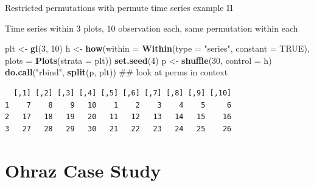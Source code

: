 \documentclass[10pt,ignorenonframetext,compress, aspectratio=169]{beamer}
\newenvironment{Shaded}{\begin{snugshade}}{\end{snugshade}}
\newcommand{\KeywordTok}[1]{\textcolor[rgb]{0.13,0.29,0.53}{\textbf{{#1}}}}
\newcommand{\DataTypeTok}[1]{\textcolor[rgb]{0.13,0.29,0.53}{{#1}}}
\newcommand{\DecValTok}[1]{\textcolor[rgb]{0.00,0.00,0.81}{{#1}}}
\newcommand{\StringTok}[1]{\textcolor[rgb]{0.31,0.60,0.02}{{#1}}}
\newcommand{\OtherTok}[1]{\textcolor[rgb]{0.56,0.35,0.01}{{#1}}}
\newcommand{\NormalTok}[1]{{#1}}
\begin{document}
\begin{frame}[fragile]{Restricted permutations with permute \textbar{}
time series example II}

Time series within 3 plots, 10 observation each, same permutation within
each

\scriptsize

\begin{Shaded}
\begin{Highlighting}[]
\NormalTok{plt <-}\StringTok{ }\KeywordTok{gl}\NormalTok{(}\DecValTok{3}\NormalTok{, }\DecValTok{10}\NormalTok{)}
\NormalTok{h <-}\StringTok{ }\KeywordTok{how}\NormalTok{(}\DataTypeTok{within =} \KeywordTok{Within}\NormalTok{(}\DataTypeTok{type =} \StringTok{"series"}\NormalTok{, }\DataTypeTok{constant =} \OtherTok{TRUE}\NormalTok{),}
         \DataTypeTok{plots =} \KeywordTok{Plots}\NormalTok{(}\DataTypeTok{strata =} \NormalTok{plt))}
\KeywordTok{set.seed}\NormalTok{(}\DecValTok{4}\NormalTok{)}
\NormalTok{p <-}\StringTok{ }\KeywordTok{shuffle}\NormalTok{(}\DecValTok{30}\NormalTok{, }\DataTypeTok{control =} \NormalTok{h)}
\KeywordTok{do.call}\NormalTok{(}\StringTok{"rbind"}\NormalTok{, }\KeywordTok{split}\NormalTok{(p, plt)) ## look at perms in context}
\end{Highlighting}
\end{Shaded}

\begin{verbatim}
  [,1] [,2] [,3] [,4] [,5] [,6] [,7] [,8] [,9] [,10]
1    7    8    9   10    1    2    3    4    5     6
2   17   18   19   20   11   12   13   14   15    16
3   27   28   29   30   21   22   23   24   25    26
\end{verbatim}

\normalsize

\end{frame}

\section{Ohraz Case Study}\label{ohraz-case-study}
\end{document}
